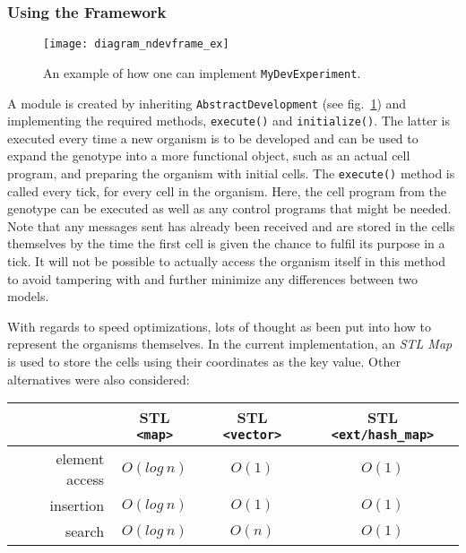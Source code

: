 \subsubsection{Using the Framework}
\begin{figure}[!ht]
	\centering
	\texttt{[image: diagram\_ndevframe\_ex]}
	\caption{An example of how one can implement \texttt{MyDevExperiment}.}
	\label{fig:diagram_ndevframe_ex}
\end{figure}

A module is created by inheriting \texttt{AbstractDevelopment} (see fig.~\ref{fig:diagram_ndevframe_ex}) and implementing the required methods, \texttt{execute()} and \texttt{initialize()}. The latter is executed every time a new organism is to be developed and can be used to expand the genotype into a more functional object, such as an actual cell program, and preparing the organism with initial cells. The \texttt{execute()} method is called every tick, for every cell in the organism. Here, the cell program from the genotype can be executed as well as any control programs that might be needed. Note that any messages sent has already been received and are stored in the cells themselves by the time the first cell is given the chance to fulfil its purpose in a tick. It will not be possible to actually access the organism itself in this method to avoid tampering with and further minimize any differences between two models.

With regards to speed optimizations, lots of thought as been put into how to represent the organisms themselves. In the current implementation, an \emph{STL Map} is used to store the cells using their coordinates as the key value. Other alternatives were also considered:

\begin{center}
	\begin{tabular}{ r | c | c | c }
		~ & STL \texttt{<map>} & STL \texttt{<vector>} & STL \texttt{<ext/hash\_map>} \\
		\hline
		element access & $O(log~n)$ & $O(1)$ & $O(1)$ \\
		\hline
		insertion & $O(log~n)$ & $O(1)$ & $O(1)$ \\
		\hline
		search & $O(log~n)$ & $O(n)$ & $O(1)$ \\
	\end{tabular}
\end{center}

